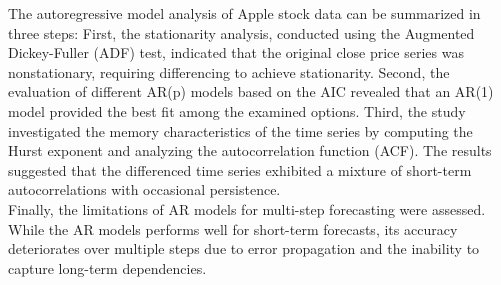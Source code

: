 \documentclass{article}
\begin{document}
The autoregressive model analysis of Apple stock data can be summarized in three steps:
First, the stationarity analysis, conducted using the Augmented Dickey-Fuller (ADF) test,
indicated that the original close price series was nonstationary, requiring differencing to
achieve stationarity. Second, the evaluation of different AR(p) models based on the
AIC revealed that an AR(1) model provided the best fit among the examined options.
Third, the study investigated the memory characteristics of the time series by computing the
Hurst exponent and analyzing the autocorrelation function (ACF). The results suggested that
the differenced time series exhibited a mixture of short-term autocorrelations with occasional
persistence.\\
Finally, the limitations of AR models for multi-step forecasting were assessed. While the AR
models performs well for short-term forecasts, its accuracy deteriorates over multiple steps
due to error propagation and the inability to capture long-term dependencies.
\end{document}
